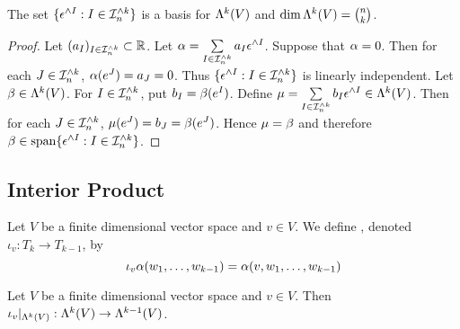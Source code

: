 \documentclass{book}
\begin{document}
	\begin{ex}
		The set $\{\epsilon^{\wedge I} : I \in \mathcal{I}_n^{\wedge k}\}$ is a basis for $\Lambda^k(V)$ and $\dim \Lambda^k(V) = {n \choose k}$.
	\end{ex}

	\begin{proof}
		Let $(a_I)_{I \in \mathcal{I}_n^{\wedge k}} \subset \mathbb{R}$. Let $\alpha = \sum\limits_{I \in \mathcal{I}_n^{\wedge k}}a_I \epsilon^{\wedge I} $. Suppose that $\alpha = 0$. Then for each $J \in \mathcal{I}_n^{\wedge k}$, $\alpha(e^J) = a_J = 0$. Thus $\{\epsilon^{\wedge I} : I \in \mathcal{I}_n^{\wedge k}\}$ is linearly independent. Let $\beta \in \Lambda^k(V)$. For $I \in \mathcal{I}_n^{\wedge k}$, put $b_I = \beta(e^I)$. Define $\mu = \sum\limits_{I \in \mathcal{I}_n^{\wedge k}} b_I\epsilon^{\wedge I} \in \Lambda^k(V)$. Then for each $J \in \mathcal{I}_n^{\wedge k}$, $\mu(e^J) = b_J = \beta(e^J)$. Hence $\mu = \beta$ and therefore $\beta \in \operatorname{span} \{\epsilon^{\wedge I} :I \in \mathcal{I}_n^{\wedge k}\}$.
	\end{proof}














	
	\subsection{Interior Product}
	\begin{defn}
		Let $V$ be a finite dimensional vector space and $v \in V$. We define , denoted $\iota_v: T_k \rightarrow T_{k-1}$, by 
		$$\iota_v \alpha (w_1, \ldots, w_{k-1}) = \alpha(v, w_1, \ldots, w_{k-1})$$
	\end{defn}

	\begin{ex}
		Let $V$ be a finite dimensional vector space and $v \in V$. Then $\iota_v|_{\Lambda^k(V)} : \Lambda^k(V) \rightarrow \Lambda^{k-1}(V)$.
	\end{ex}
	
\end{document}
